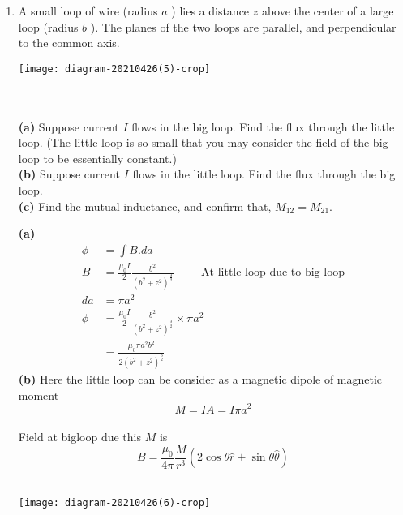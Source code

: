\begin{enumerate}[ label=\color{ocre}\textbf{\arabic*.}]
\begin{answer}
	\end{answer}
	\item A small loop of wire (radius $a$ ) lies a distance $z$ above the center of a large loop (radius $b$ ). The planes of the two loops are parallel, and perpendicular to the common axis. \\
	\begin{minipage}{.45\textwidth}
		\begin{center}
			\texttt{[image: diagram-20210426(5)-crop]}
		\end{center}
	\end{minipage}\\\vspace{.2cm}\\
	\textbf{(a)} Suppose current $I$ flows in the big loop. Find the flux through the little loop. (The little loop is so small that you may consider the field of the big loop to be essentially constant.)\\
	\textbf{(b)} Suppose current $I$ flows in the little loop. Find the flux through the big loop. \\
	\textbf{(c)} Find the mutual inductance, and confirm that, $M_{12}=M_{21}$.
	\begin{answer}
		\textbf{(a)}
		\begin{align*}
		\phi&=\int B.da\\
		B&=\frac{\mu_{0}I}{2}\frac{b^2}{(b^2+z^2)^\frac{3}{2}}\hspace{1cm}\text{At little loop due to big loop}\\
		da&=\pi a^2\\
		\phi&=\frac{\mu_{0}I}{2}\frac{b^2}{(b^2+z^2)^\frac{3}{2}}\times\pi a^2\\
		&=\frac{\mu_{0}\pi a^2 b^2}{2(b^2+z^2)^\frac{3}{2}}
		\end{align*}
		\textbf{(b)} \quad Here the little loop can be consider as a magnetic dipole of magnetic moment \\
		$$ M=IA=I\pi a^2$$\\
		Field at bigloop due this $M$ is\\ 
		$$ B=\frac{\mu_{0}}{4\pi}\frac{M}{r^3}(2\cos\theta\hat{r}+\sin\theta\hat{\theta})$$\\
		\begin{flushright}
			\begin{minipage}{.45\textwidth}
				\texttt{[image: diagram-20210426(6)-crop]}
			\end{minipage}\\

\end{flushright}
\end{answer}
\end{enumerate}

